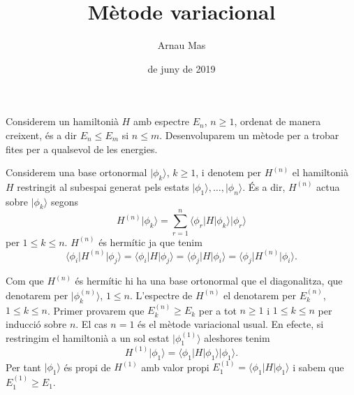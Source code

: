 \documentclass[12pt]{article}
\title{\sffamily {\bfseries Entrega 3:} Mètode variacional}
\author{\sffamily Arnau Mas}
\date{\sffamily 3 de juny de 2019}
\numberwithin{table}{section}
\numberwithin{figure}{section}
\numberwithin{equation}{section}
\newcommand{\ket}[1]{\vert {#1} \rangle}
\newcommand{\bra}[1]{\langle #1 \vert}
\begin{document}
\maketitle
Considerem un hamiltonià \( H \) amb espectre \( E_n \), \( n \geq 1 \), ordenat de manera creixent, és a dir \( E_n \leq E_m \) si \( n \leq m \). Desenvoluparem un mètode per a trobar fites per a qualsevol de les energies. 

Considerem una base ortonormal \( \ket{\phi_k} \), \( k \geq 1 \), i denotem per \( H^{(n)} \) el hamiltonià \( H \) restringit al subespai generat pels estats \( \ket{\phi_1}, \dots, \ket{\phi_n} \). És a dir, \( H^{(n)} \) actua sobre \( \ket{\phi_k} \) segons
\begin{equation*}
	H^{(n)}\ket{\phi_k} = \sum_{r = 1}^{n}\bra{\phi_r}H\ket{\phi_k} \ket{\phi_r} 
\end{equation*}
per \( 1 \leq k \leq n \). \( H^{(n)} \) és hermític ja que tenim
\begin{equation*}
	\bra{\phi_i}H^{(n)}\ket{\phi_j} = \bra{\phi_i} H \ket{\phi_j} = \bra{\phi_j} H \ket{\phi_i} = \bra{\phi_j} H^{(n)} \ket{\phi_i}. 
\end{equation*}

Com que \( H^{(n)} \) és hermític hi ha una base ortonormal que el diagonalitza, que denotarem per \( \ket{\phi_k^{(n)}} \), \( 1 \leq n \). L'espectre de \( H^{(n)} \) el denotarem per \( E_k^{(n)} \), \( 1 \leq k \leq n \). Primer provarem que \( E_k^{(n)} \geq E_k \) per a tot \( n \geq 1 \) i \( 1 \leq k \leq n \) per inducció sobre \( n \). El cas \( n = 1 \) és el mètode variacional usual. En efecte, si restringim el hamiltonià a un sol estat \( \ket{\phi_1^{(1)}} \) aleshores tenim
\begin{equation*}
	H^{(1)} \ket{\phi_1} = \bra{\phi_1}H\ket{\phi_1} \ket{\phi_1}.
\end{equation*}
Per tant \( \ket{\phi_1} \) és propi de \( H^{(1)} \) amb valor propi \( E_1^{(1)} = \bra{\phi_1}H\ket{\phi_1} \) i sabem que \( E_1^{(1)} \geq E_1 \).
\end{document}
